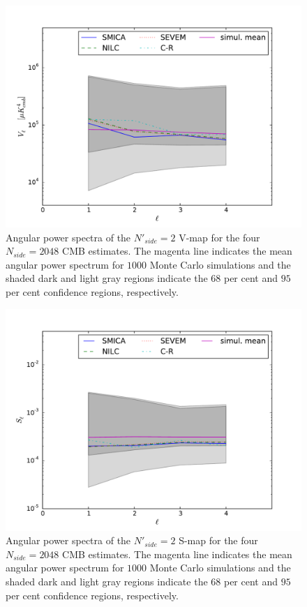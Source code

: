\begin{figure}
\centering
\includegraphics[width=\textwidth]{figures/chapter-vsk/Vl_u73.pdf}
\caption{Angular power spectra of the $N'_{side} = 2$ V-map for the four $N_{side} = 2048$ CMB estimates. The magenta line indicates the mean angular power spectrum for $1000$ Monte Carlo simulations and the shaded dark and light gray regions indicate the $68$ per cent and $95$ per cent confidence regions, respectively.}
\label{Fig:4}
\end{figure}

\begin{figure}
\centering
\includegraphics[width=\textwidth]{figures/chapter-vsk/Sl_u73.pdf}
\caption{Angular power spectra of the $N'_{side} = 2$ S-map for the four $N_{side} = 2048$ CMB estimates. The magenta line indicates the mean angular power spectrum for $1000$ Monte Carlo simulations and the shaded dark and light gray regions indicate the $68$ per cent and $95$ per cent confidence regions, respectively.}
\label{Fig:4a}
\end{figure}

